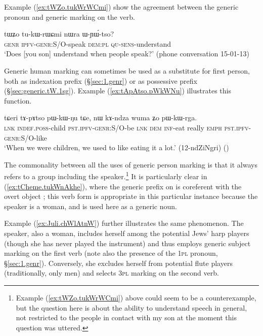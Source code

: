 Example (\ref{ex:tWZo.tukWrWCmi}) show the agreement between the generic pronoun  and generic marking on the verb.

\begin{exe}
\ex   \label{ex:tWZo.tukWrWCmi}
 \gll  tɯʑo tu-kɯ-rɯɕmi nɯra ɯ-ɲɯ́-tso? \\
 \textsc{genr} \textsc{ipfv}-\textsc{genr}:S/O-speak \textsc{dem}:\textsc{pl} \textsc{qu}-\textsc{sens}-understand \\
 \glt `Does [you son] understand when people speak?' (phone conversation 15-01-13)
\end{exe}

Generic human marking can sometimes be used as a substitute for first person, both as indexation prefix (§\ref{sec:1.genr}) or as possessive prefix (§\ref{sec:generic.tW.1sg}). Example (\ref{ex:tApAtso.pWkWNu}) illustrates this function.

\begin{exe}
\ex   \label{ex:tApAtso.pWkWNu}
 \gll   tɕeri tɤ-pɤtso pɯ-kɯ-ŋu tɕe, nɯ kɤ-ndza wuma ʑo pɯ-kɯ-rga. \\
\textsc{lnk} \textsc{indef}.\textsc{poss}-child \textsc{pst}.\textsc{ipfv}-\textsc{genr}:S/O-be \textsc{lnk} \textsc{dem} \textsc{inf}-eat really \textsc{emph} \textsc{pst}.\textsc{ipfv}-\textsc{genr}:S/O-like \\
\glt `When we were children, we used to like eating it a lot.' (12-ndZiNgri) ()
\end{exe}

The commonality between all the uses of generic person marking is that it always refers to a group including the speaker.\footnote{Example (\ref{ex:tWZo.tukWrWCmi}) above could seem to be a counterexample, but the question here is about the ability to understand speech in general, not restricted to the people in contact with my son at the moment this question was uttered. } It is particularly clear in (\ref{ex:tCheme.tukWnAkhe}), where the generic prefix  on   is coreferent with the overt object ; this verb form is appropriate in this particular instance because the speaker is a woman, and  is used here as a generic noun.

Example (\ref{ex:Juli.chWlAtnW}) further illustrates the same phenomenon. The speaker, also a woman, includes herself among the potential Jews' harp players (though she has never played the instrument) and thus employs generic subject marking on the first verb (note also the presence of the \textsc{1pl} pronoun, §\ref{sec:1.genr}). Conversely, she excludes herself from potential flute players (traditionally, only men) and selects \textsc{3pl} marking on the second verb. 

